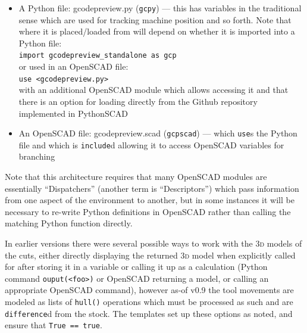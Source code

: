 \documentclass{ltxdoc}
\begin{document}
\begin{itemize}
\item A Python file: gcodepreview.py (\texttt{gcpy}) --- this has
      variables in the traditional sense which are used for tracking machine position and so forth. 
      Note that where it is placed/loaded from will depend on whether it is imported into
      a Python file:\\
      \verb|import gcodepreview_standalone as gcp|\\ 
      or used in an OpenSCAD file:\\
      \verb|use <gcodepreview.py>|\\
      with an additional OpenSCAD module which allows accessing it and that there
      is an option for loading directly from the Github repository implemented in
      PythonSCAD
\item An OpenSCAD file: gcodepreview.scad (\texttt{gcpscad}) --- which \verb|use|s the Python file 
      and which is \texttt{include}d allowing it to access OpenSCAD variables for branching   
\end{itemize}

\noindent Note that this architecture requires that many OpenSCAD modules are essentially ``Dispatchers'' (another term is ``Descriptors'') which pass information from one aspect of the environment to another, but in some instances it will be necessary to re-write Python definitions in OpenSCAD rather than calling the matching Python function directly.

In earlier versions there were several possible ways to work with the \textsc{3d} models of the cuts, either directly displaying the returned \textsc{3d} model when explicitly called for after storing it in a variable or calling it up as a calculation (Python command \verb|ouput(<foo>)| or OpenSCAD returning a model, or calling an appropriate OpenSCAD command), however as-of v0.9 the tool movements are modeled as lists of \verb|hull()| operations which must be processed as such and are \verb|difference|d from the stock. The templates set up these options as noted, and ensure that \verb|True == true|.
\end{document}
